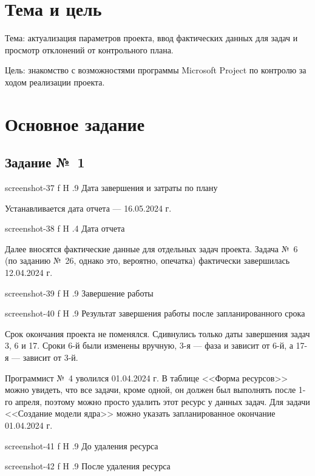 \documentclass{bmstu}
\begin{document}
\section{Тема и цель}

Тема: актуализация параметров проекта, ввод фактических данных для задач и просмотр отклонений от контрольного плана.

Цель: знакомство с возможностями программы Microsoft Project по контролю за ходом реализации проекта.

\section{Основное задание}

\subsection{Задание №~1}

    {screenshot-37}
    {f}
    {H}
    {.9\textwidth}
    {Дата завершения и затраты по плану}
    
Устанавливается дата отчета --- 16.05.2024 г.

    {screenshot-38}
    {f}
    {H}
    {.4\textwidth}
    {Дата отчета}
    
Далее вносятся фактические данные для отдельных задач проекта. 
Задача №~6 (по заданию №~26, однако это, вероятно, опечатка) фактически завершилась 12.04.2024 г.

    {screenshot-39}
    {f}
    {H}
    {.9\textwidth}
    {Завершение работы}
    
    {screenshot-40}
    {f}
    {H}
    {.9\textwidth}
    {Результат завершения работы после запланированного срока}
    
Срок окончания проекта не поменялся. 
Сдивнулись только даты завершения задач 3, 6 и 17. 
Сроки 6-й были изменены вручную, 3-я --- фаза и зависит от 6-й, а 17-я --- зависит от 3-й.

Программист №~4 уволился 01.04.2024 г. 
В таблице <<Форма ресурсов>> можно увидеть, что все задачи, кроме одной, он должен был выполнять после 1-го апреля, поэтому можно просто удалить этот ресурс у данных задач. 
Для задачи <<Создание модели ядра>> можно указать запланированное окончание 01.04.2024 г.

    {screenshot-41}
    {f}
    {H}
    {.9\textwidth}
    {До удаления ресурса}
    
    {screenshot-42}
    {f}
    {H}
    {.9\textwidth}
    {После удаления ресурса}
    
\end{document}
